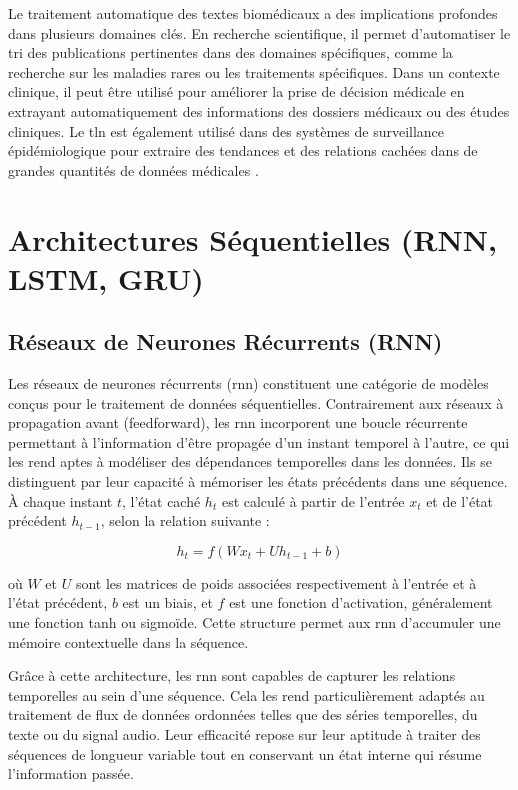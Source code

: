 \documentclass[12pt]{report}
\begin{document}
Le traitement automatique des textes biomédicaux a des implications profondes dans plusieurs domaines clés. En recherche scientifique, il permet d'automatiser le tri des publications pertinentes dans des domaines spécifiques, comme la recherche sur les maladies rares ou les traitements spécifiques. Dans un contexte clinique, il peut être utilisé pour améliorer la prise de décision médicale en extrayant automatiquement des informations des dossiers médicaux ou des études cliniques. Le \gls{tln} est également utilisé dans des systèmes de surveillance épidémiologique pour extraire des tendances et des relations cachées dans de grandes quantités de données médicales \cite{mikolov2018advances}.

\section{Architectures Séquentielles (RNN, LSTM, GRU)}

\subsection{Réseaux de Neurones Récurrents (RNN)}

Les réseaux de neurones récurrents (\gls{rnn}) constituent une catégorie de modèles conçus pour le traitement de données séquentielles. Contrairement aux réseaux à propagation avant (feedforward), les \gls{rnn} incorporent une boucle récurrente permettant à l’information d’être propagée d’un instant temporel à l’autre, ce qui les rend aptes à modéliser des dépendances temporelles dans les données. Ils se distinguent par leur capacité à mémoriser les états précédents dans une séquence. À chaque instant \( t \), l’état caché \( h_t \) est calculé à partir de l’entrée \( x_t \) et de l’état précédent \( h_{t-1} \), selon la relation suivante :

\[
h_t = f(Wx_t + Uh_{t-1} + b)
\]

où \( W \) et \( U \) sont les matrices de poids associées respectivement à l’entrée et à l’état précédent, \( b \) est un biais, et \( f \) est une fonction d’activation, généralement une fonction tanh ou sigmoïde. Cette structure permet aux \gls{rnn} d’accumuler une mémoire contextuelle dans la séquence.

Grâce à cette architecture, les \gls{rnn} sont capables de capturer les relations temporelles au sein d’une séquence. Cela les rend particulièrement adaptés au traitement de flux de données ordonnées telles que des séries temporelles, du texte ou du signal audio. Leur efficacité repose sur leur aptitude à traiter des séquences de longueur variable tout en conservant un état interne qui résume l'information passée.
\end{document}
